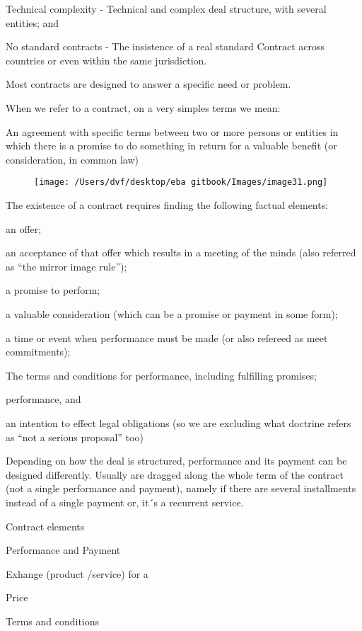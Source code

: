 \documentclass[]{book}
\theoremstyle{definition}
\theoremstyle{definition}
\theoremstyle{definition}
\theoremstyle{remark}
\begin{document}
Technical complexity - Technical and complex deal structure, with
several entities; and

No standard contracts - The insistence of a real standard Contract
across countries or even within the same jurisdiction.

Most contracts are designed to answer a specific need or problem.

When we refer to a contract, on a very simples terms we mean:

An agreement with specific terms between two or more persons or entities
in which there is a promise to do something in return for a valuable
benefit (or consideration, in common law)

\begin{figure}[htbp]
\centering
\texttt{[image: /Users/dvf/desktop/eba gitbook/Images/image31.png]}
\caption{}
\end{figure}

The existence of a contract requires finding the following factual
elements:

an offer;

an acceptance of that offer which results in a meeting of the minds
(also referred as ``the mirror image rule'');

a promise to perform;

a valuable consideration (which can be a promise or payment in some
form);

a time or event when performance must be made (or also refereed as meet
commitments);

The terms and conditions for performance, including fulfilling promises;

performance, and

an intention to effect legal obligations (so we are excluding what
doctrine refers as ``not a serious proposal'' too)

Depending on how the deal is structured, performance and its payment can
be designed differently. Usually are dragged along the whole term of the
contract (not a single performance and payment), namely if there are
several installments instead of a single payment or, it´s a recurrent
service.

Contract elements

Performance and Payment

Exhange (product /service) for a

Price

Terms and conditions
\end{document}
